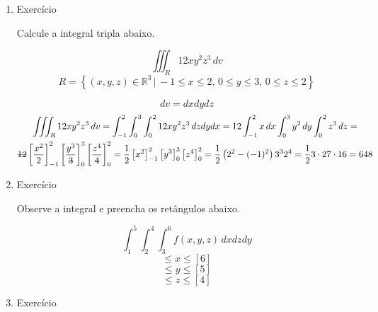\begin{enumerate}
	\item Exercício
	
	Calcule a integral tripla abaixo.
	
	\begin{equation*}
		\iiint_R 12xy^2z^3\,dv
	\end{equation*}
	\begin{equation*}
		R = \left\{(x, y, z) \in \mathbb{R}^3 \,|\, -1 \leq x \leq 2,\, 0 \leq y \leq 3,\, 0 \leq z \leq 2\right\}
	\end{equation*}
	
	\begin{equation*}
		dv = dxdydz
	\end{equation*}
	\begin{gather*}
		\iiint_R 12xy^2z^3\,dv = \int_{-1}^2 \int_0^3 \int_0^2 12xy^2z^3\, dz dy dx = 12\int_{-1}^2 x\, dx \int_0^3 y^2\, dy \int_0^2 z^3\, dz =\\ {\overstrike{12}}\left[\dfrac{x^2}{2}\right]_{-1}^2 \left[\dfrac{y^3}{\overstrike{3}}\right]_0^3 \left[\dfrac{z^4}{\overstrike{4}}\right]_0^2 = \dfrac{1}{2}\left[x^2\right]_{-1}^2 \left[y^3\right]_0^3 \left[z^4\right]_0^2 = \dfrac{1}{2}\left(2^2 - (-1)^2\right)3^3 2^4 = \dfrac{1}{2}3\cdot27\cdot16 = 648
	\end{gather*}
	
	\item Exercício
	
	Observe a integral e preencha os retângulos abaixo.
	
	\begin{equation*}
		\int_1^5 \int_2^4 \int_3^6 f(x,y,z)\, dxdzdy	
	\end{equation*}
	\begin{equation*}
		[3] \leq x \leq [6]
	\end{equation*}
	\begin{equation*}
		[1] \leq y \leq [5]
	\end{equation*}
	\begin{equation*}
		[2] \leq z \leq [4]
	\end{equation*}
	
	\item Exercício
	

\end{enumerate}
